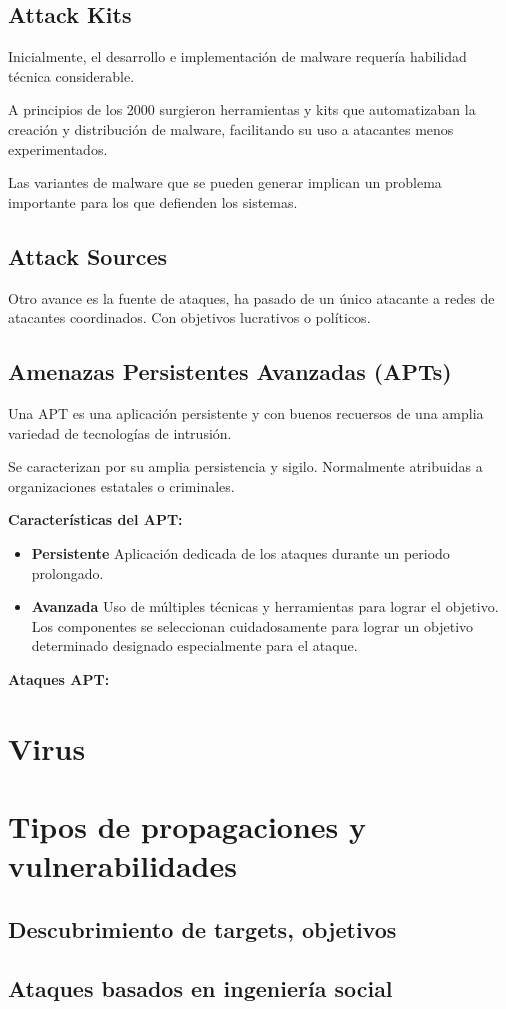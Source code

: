 \documentclass[11pt,a4paper]{article}
\begin{document}
\subsection{Attack Kits}

Inicialmente, el desarrollo e implementación de malware requería habilidad técnica considerable.

A principios de los 2000 surgieron herramientas y kits que automatizaban la creación y distribución de malware, facilitando su uso a atacantes menos experimentados.

Las variantes de malware que se pueden generar implican un problema importante para los que defienden los sistemas.

\subsection{Attack Sources}

Otro avance es la fuente de ataques, ha pasado de un único atacante a redes de atacantes coordinados. Con objetivos lucrativos o políticos.

\subsection{Amenazas Persistentes Avanzadas (APTs)}

Una APT es una aplicación persistente y con buenos recuersos de una amplia variedad de tecnologías de intrusión.

Se caracterizan por su amplia persistencia y sigilo. Normalmente atribuidas a organizaciones estatales o criminales.

\textbf{Características del APT:}
\begin{itemize}
    \item \textbf{Persistente} Aplicación dedicada de los ataques durante un periodo prolongado.
    \item \textbf{Avanzada} Uso de múltiples técnicas y herramientas para lograr el objetivo. Los componentes se seleccionan cuidadosamente para lograr un objetivo determinado designado especialmente para el ataque.
\end{itemize}

\textbf{Ataques APT:}



\section{Virus}

\section{Tipos de propagaciones y vulnerabilidades}

\subsection{Descubrimiento de targets, objetivos}

\subsection{Ataques basados en ingeniería social}
\end{document}
